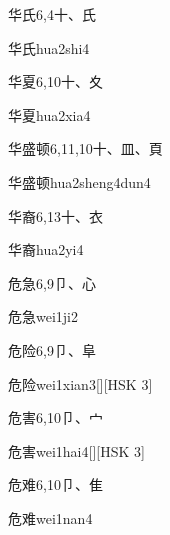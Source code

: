 \begin{entry}{华氏}{6,4}{⼗、⽒}
  \begin{phonetics}{华氏}{hua2shi4}
  \end{phonetics}
\end{entry}

\begin{entry}{华夏}{6,10}{⼗、⼢}
  \begin{phonetics}{华夏}{hua2xia4}
  \end{phonetics}
\end{entry}

\begin{entry}{华盛顿}{6,11,10}{⼗、⽫、⾴}
  \begin{phonetics}{华盛顿}{hua2sheng4dun4}
  \end{phonetics}
\end{entry}

\begin{entry}{华裔}{6,13}{⼗、⾐}
  \begin{phonetics}{华裔}{hua2yi4}
  \end{phonetics}
\end{entry}

\begin{entry}{危急}{6,9}{⼙、⼼}
  \begin{phonetics}{危急}{wei1ji2}
  \end{phonetics}
\end{entry}

\begin{entry}{危险}{6,9}{⼙、⾩}
  \begin{phonetics}{危险}{wei1xian3}[][HSK 3]
  \end{phonetics}
\end{entry}

\begin{entry}{危害}{6,10}{⼙、⼧}
  \begin{phonetics}{危害}{wei1hai4}[][HSK 3]
  \end{phonetics}
\end{entry}

\begin{entry}{危难}{6,10}{⼙、⾫}
  \begin{phonetics}{危难}{wei1nan4}
  \end{phonetics}
\end{entry}

